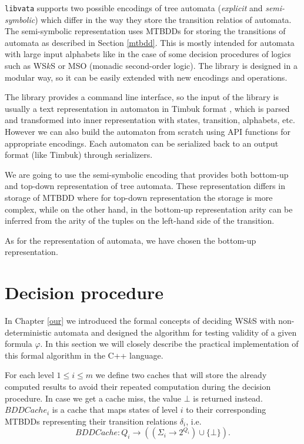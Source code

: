 \texttt{libvata} supports two possible encodings of tree automata
(\emph{explicit} and \emph{semi-symbolic}) which differ in the way they store
the transition relatios of automata. The semi-symbolic representation uses
MTBDDs for storing the transitions of automata as described in Section
\ref{mtbdd}. This is mostly intended for automata with large input alphabets
like in the case of some decision procedures of logics such as WS$k$S or MSO
\cite{mso} (monadic second-order logic). The library is designed in a modular
way, so it can be easily extended with new encodings and operations.

The library provides a command line interface, so the input of the library is
usually a text representation in automaton in Timbuk format \cite{timbuk}, which
is parsed and transformed into inner representation with states, transition,
alphabets, etc. However we can also build the automaton from scratch using API
functions for appropriate encodings. Each automaton can be serialized back to an
output format (like Timbuk) through serializers.

We are going to use the semi-symbolic encoding that provides both bottom-up and
top-down representation of tree automata. These representation differs in
storage of MTBDD where for top-down representation the storage is more complex,
while on the other hand, in the bottom-up representation arity can be inferred
from the arity of the tuples on the left-hand side of the transition.

As for the representation of automata, we have chosen the bottom-up
representation.

 \section{Decision procedure}
 
 In Chapter \ref{our} we introduced the formal concepts of deciding WS$k$S
 with non-deterministic automata and designed the algorithm for testing
 validity of a given formula $\varphi$. In this section we will closely describe
 the practical implementation of this formal algorithm in the C++ language.
 
 For each level $1 \leq i \leq m$ we define two caches that will store the
 already computed results to avoid their repeated computation during the
 decision procedure. In case we get a cache miss, the value $\bot$ is returned
 instead. $\mathit{BDDCache}_i$ is a cache that maps states of level $i$ to
 their corresponding MTBDDs representing their transition relations $\delta_i$, i.e.
 \begin{equation}
  \mathit{BDDCache} : Q_i \rightarrow ((\Sigma_i \rightarrow 2^{Q_i}) \cup
  \{\bot\}).
 \end{equation}
 
